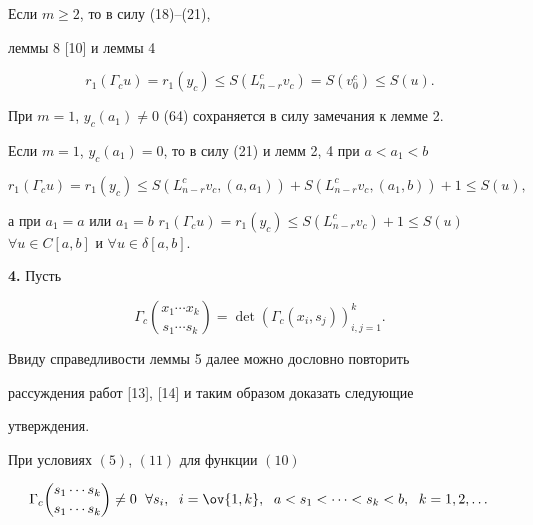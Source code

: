  


\begin{pf} Если $m\ge 2$, то в силу (18)--(21), 


леммы 8 [10] и леммы 4 


\begin{equation} 


r_1(\Gamma_c u)=r_1(y_c)\le S(L^c_{n-r}v_c)= 


S(v^c_0)\le S(u). 


\end{equation} 


При $m=1$, $y_c(a_1)\ne 0$ (64) сохраняется в силу замечания к лемме 2. 


 


Если $m=1$, $y_c(a_1)=0$, то в силу (21) и лемм 2, 4 при $a<a_1<b$ 


$$ 


r_1(\Gamma_c u)=r_1(y_c)\le S(L^c_{n-r}v_c,(a,a_1))+ 


S(L^c_{n-r}v_c,(a_1,b))+1\le S(u), 


$$ 


а при $a_1=a$ или $a_1=b$\; $r_1(\Gamma_c u)=r_1(y_c)\le 


S(L^c_{n-r}v_c)+1\le S(u)$ $\forall u\in C[a,b]$ и $\forall 


u\in\delta[a,b]$. 


\end{pf} 


 


{\bf 4.} Пусть 


\begin{equation} 


\Gamma_c\binom{x_1\dotsb x_k}{s_1\dotsb s_k}= 


\det(\Gamma_c(x_i,s_j))^k_{i,j=1}. 


\end{equation} 


 


Ввиду справедливости леммы 5 далее можно дословно повторить 


рассуждения работ [13], [14] и таким образом доказать следующие 


утверждения. 


 


\begin{lem} При условиях $(5)$, $(11)$ для функции $(10)$ 


$$ 


\Gamma_c\binom{s_1\dotsb s_k}{s_1\dotsb s_k}\ne 0 


\ \;\forall s_i,\ \; i=\ov{1,k},\ \; a<s_1<\dotsb<s_k<b, 


\ \; k=1,2,\dotsc 


$$ 


\end{lem} 


